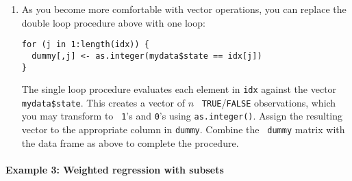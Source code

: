 \begin{enumerate}
\begin{enumerate}
\item As you become more comfortable with vector operations, you can
replace the double loop procedure above with one loop:   
\begin{verbatim}
for (j in 1:length(idx)) { 
  dummy[,j] <- as.integer(mydata$state == idx[j])
}
\end{verbatim}
The single loop procedure evaluates each element in {\tt idx} against the vector {\tt mydata\$state}.  This creates a vector of $n$ {\tt
    TRUE}/{\tt FALSE} observations, which you may transform to {\tt
    1}'s and {\tt 0}'s using {\tt as.integer()}.  Assign the resulting
  vector to the appropriate column in {\tt dummy}.  Combine the {\tt
dummy} matrix with the data frame as above to complete the procedure.
\end{enumerate}
\end{enumerate}

\paragraph{Example 3: Weighted regression with subsets}  

